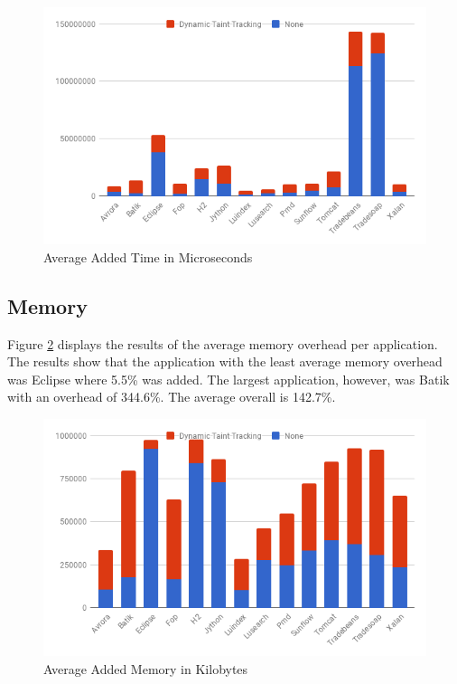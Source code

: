 \begin{figure}[H]
    \centering
    \includegraphics[width=\textwidth]{images/Time.png}
    \caption{Average Added Time in Microseconds}
    \label{fig:Time}
\end{figure}



\subsection{Memory}
Figure \ref{fig:Memory} displays the results of the average memory overhead per application. The results show that the application with the least average memory overhead was Eclipse where 5.5\% was added. The largest application, however, was Batik with an overhead of 344.6\%. The average overall is 142.7\%.

\begin{figure}[H]
    \centering
    \includegraphics[width=\textwidth]{images/Memory.png}
    \caption{Average Added Memory in Kilobytes}
    \label{fig:Memory}
\end{figure}
